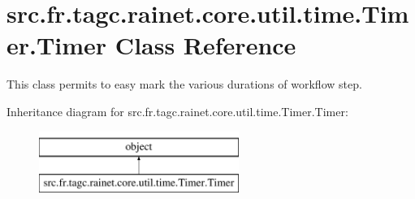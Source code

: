 \hypertarget{classsrc_1_1fr_1_1tagc_1_1rainet_1_1core_1_1util_1_1time_1_1Timer_1_1Timer}{\section{src.\-fr.\-tagc.\-rainet.\-core.\-util.\-time.\-Timer.\-Timer Class Reference}
\label{classsrc_1_1fr_1_1tagc_1_1rainet_1_1core_1_1util_1_1time_1_1Timer_1_1Timer}
}


This class permits to easy mark the various durations of workflow step.  


Inheritance diagram for src.\-fr.\-tagc.\-rainet.\-core.\-util.\-time.\-Timer.\-Timer\-:\begin{figure}[H]
\begin{center}
\leavevmode
\includegraphics[height=2.000000cm]{classsrc_1_1fr_1_1tagc_1_1rainet_1_1core_1_1util_1_1time_1_1Timer_1_1Timer}
\end{center}
\end{figure}

